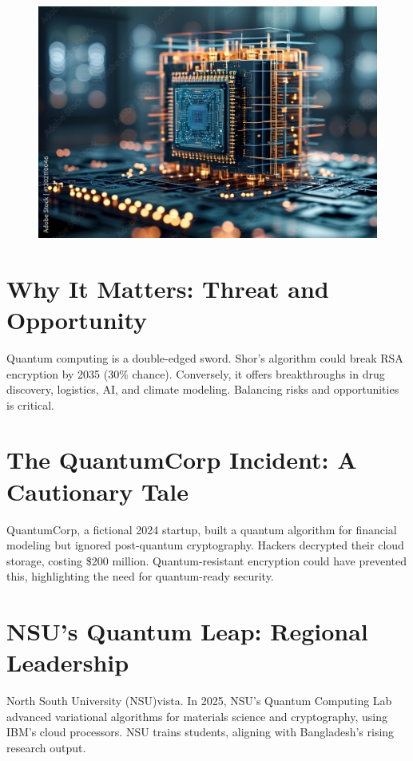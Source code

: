 \documentclass[a4paper,10pt,twocolumn]{memoir}
\begin{document}
\begin{figure}[ht]
  \centering
  \includegraphics[width=\columnwidth]{QC-4.jpeg}
  \caption*{}
  \label{fig4}
\end{figure}


\section*{Why It Matters: Threat and Opportunity}
Quantum computing is a double-edged sword. Shor's algorithm could break RSA encryption by 2035 (30\% chance). Conversely, it offers breakthroughs in drug discovery, logistics, AI, and climate modeling. Balancing risks and opportunities is critical.


\section*{The QuantumCorp Incident: A Cautionary Tale}
QuantumCorp, a fictional 2024 startup, built a quantum algorithm for financial modeling but ignored post-quantum cryptography. Hackers decrypted their cloud storage, costing \$200 million. Quantum-resistant encryption could have prevented this, highlighting the need for quantum-ready security.


\section*{NSU's Quantum Leap: Regional Leadership}
North South University (NSU)vista. In 2025, NSU's Quantum Computing Lab advanced variational algorithms for materials science and cryptography, using IBM's cloud processors. NSU trains students, aligning with Bangladesh's rising research output.
\end{document}
